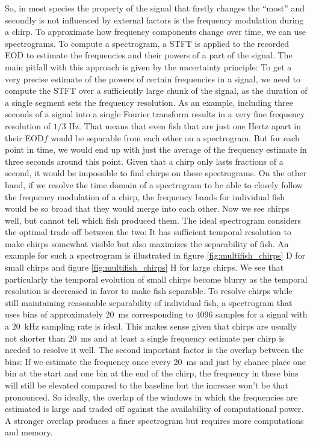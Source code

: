 So, in most species the property of the signal that firstly changes the
\enquote{most} and secondly is not influenced by external factors is the
frequency modulation during a chirp. To approximate how frequency components
change over time, we can use spectrograms. To compute a spectrogram, a
\acrfull{STFT} is applied to the recorded EOD to estimate the frequencies and
their powers of a part of the signal. The main pitfall with this approach is
given by the uncertainty principle: To get a very precise estimate of the
powers of certain frequencies in a signal, we need to compute the STFT over a
sufficiently large chunk of the signal, as the duration of a single segment
sets the frequency resolution. As an example, including three seconds of a
signal into a single Fourier transform results in a very fine frequency
resolution of $1/3$ \si{\hertz}. That means that even fish that are just one
Hertz apart in their EOD$f$ would be separable from each other on a
spectrogram. But for each point in time, we would end up with just the average
of the frequency estimate in three seconds around this point. Given that a
chirp only lasts fractions of a second, it would be impossible to find chirps
on these spectrograms. On the other hand, if we resolve the time domain of a
spectrogram to be able to closely follow the frequency modulation of a chirp,
the frequency bands for individual fish would be so broad that they would merge
into each other. Now we see chirps well, but cannot tell which fish produced
them. The ideal spectrogram considers the optimal trade-off between the two: It
has sufficient temporal resolution to make chirps somewhat visible but also
maximizes the separability of fish. An example for such a spectrogram is
illustrated in figure \ref{fig:multifish_chirps} D for small chirps and figure
\ref{fig:multifish_chirps} H for large chirps. We see that particularly the
temporal evolution of small chirps become blurry as the temporal resolution is
decreased in favor to make fish separable. To resolve chirps while still
maintaining reasonable separability of individual fish, a spectrogram that uses
bins of approximately \SI{20}{\milli\second} corresponding to 4096 samples for
a signal with a \SI{20}{\kilo\hertz} sampling rate is ideal. This makes sense
given that chirps are usually not shorter than \SI{20}{\milli\second} and at
least a single frequency estimate per chirp is needed to resolve it well. The
second important factor is the overlap between the bins: If we estimate the
frequency once every \SI{20}{\milli\second} and just by chance place one bin at
the start and one bin at the end of the chirp, the frequency in these bins will
still be elevated compared to the baseline but the increase won't be that
pronounced. So ideally, the overlap of the windows in which the frequencies are
estimated is large and traded off against the availability of computational
power. A stronger overlap produces a finer spectrogram but requires more
computations and memory.

